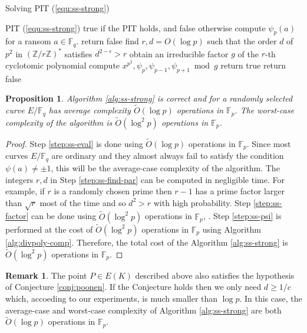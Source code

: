 \documentclass[12pt]{article}
\theoremstyle{plain}
\newtheorem{proposition}[theorem]{Proposition}
\theoremstyle{definition}
\newtheorem*{remark}{Remark}
\newcommand{\tildO}{\tilde{O}}
\def\Z{\ensuremath{\mathbb{Z}}}
\def\F{\ensuremath{\mathbb{F}}}
\begin{document}
\begin{algorithm}[H]
	\caption{Solving PIT (\ref{equ:ss-strong})}
	\label{alg:ss-strong}
	\begin{algorithmic}[1]
		\REQUIRE PIT (\ref{equ:ss-strong})
		\ENSURE true if the PIT holds, and false otherwise
		\STATE\label{step:ss-eval}
		compute $\psi_p(a)$ for a ransom $a \in \F_q$.
			\STATE return false
		\ENDIF
		\STATE\label{step:ss-find-par}
		find $r, d = O(\log p)$ such that the order $d$ of $p^2$ in $(\Z/r\Z)^*$ satisfies $d^{2 - 
		\epsilon} > r$
		\STATE\label{step:ss-factor}
		obtain an irreducible factor $g$ of the $r$-th cyclotomic polynomial
		\STATE\label{step:ss-psi}
		compute $x^{p^2}, \psi_p, \psi_{p - 1}, \psi_{p + 1} \bmod g$
			\STATE return true
		\ELSE
			\STATE return false
		\ENDIF
	\end{algorithmic}
\end{algorithm}

\begin{proposition}
	\label{prop:ss-strong}
	Algorithm \ref{alg:ss-strong} is correct and for a randomly selected curve $E/\F_q$ has average 
	complexity $\tildO(\log p)$ operations in $\F_p$. The worst-case complexity of the algorithm is 
	$\tildO(\log^2 p)$ operations in $\F_p$.
\end{proposition}
\begin{proof}
	Step \ref{step:ss-eval} is done using $\tildO(\log p)$ operations in $\F_p$. Since most curves 
	$E/\F_q$ are ordinary and they almost always fail to satisfy the condition $\psi(a) \ne \pm 1$, 
	this will be the average-case complexity of the algorithm. The integers $r, d$ in Step 
	\ref{step:ss-find-par} can be computed in negligible time. For example, if $r$ is a randomly 
	chosen prime then $r - 1$ has a prime factor larger than $\sqrt{r}$ most of the time and so 
	$d^2 > r$ with high probability. Step \ref{step:ss-factor} can be done using $\tildO(\log^2 p)$ 
	operations in $\F_p$, \cite{shoup1994}. Step \ref{step:ss-psi} is performed at the cost of 
	$\tildO(\log^2 p)$ operations in $\F_p$ using Algorithm \ref{alg:divpoly-comp}. Therefore, the 
	total cost of the Algorithm \ref{alg:ss-strong} is $\tildO(\log^2 p)$ operations in $\F_p$.
\end{proof}

\begin{remark}
	The point $P \in E(K)$ described above also satisfies the hypothesis of Conjecture 
	\ref{conj:poonen}. If the Conjecture holds then we only need $d \ge 1 / c$ which, accoeding to 
	our experiments, is much smaller than $\log p$. In this case, the average-case and worst-case 
	complexity of Algorithm \ref{alg:ss-strong} are both $\tildO(\log p)$ operations in $\F_p$.
\end{remark}
\end{document}
